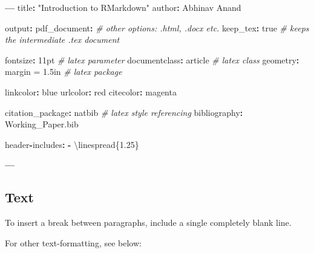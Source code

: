 \documentclass[11pt,]{article}
\newenvironment{Shaded}{\begin{snugshade}}{\end{snugshade}}
\newcommand{\FloatTok}[1]{\textcolor[rgb]{0.00,0.00,0.81}{#1}}
\newcommand{\StringTok}[1]{\textcolor[rgb]{0.31,0.60,0.02}{#1}}
\newcommand{\CommentTok}[1]{\textcolor[rgb]{0.56,0.35,0.01}{\textit{#1}}}
\newcommand{\OperatorTok}[1]{\textcolor[rgb]{0.81,0.36,0.00}{\textbf{#1}}}
\newcommand{\NormalTok}[1]{#1}
\begin{document}
\begin{Shaded}
\begin{Highlighting}[]
\OperatorTok{---}
\NormalTok{title}\OperatorTok{:}\StringTok{ "Introduction to RMarkdown"}
\NormalTok{author}\OperatorTok{:}\StringTok{ }\NormalTok{Abhinav Anand}

\NormalTok{output}\OperatorTok{:}
\StringTok{  }\NormalTok{pdf_document}\OperatorTok{:}\StringTok{ }\CommentTok{# other options: .html, .docx etc.}
\StringTok{    }\NormalTok{keep_tex}\OperatorTok{:}\StringTok{ }\NormalTok{true }\CommentTok{# keeps the intermediate .tex document}

\NormalTok{fontsize}\OperatorTok{:}\StringTok{ }\NormalTok{11pt }\CommentTok{# latex parameter}
\NormalTok{documentclass}\OperatorTok{:}\StringTok{ }\NormalTok{article }\CommentTok{# latex class}
\NormalTok{geometry}\OperatorTok{:}\StringTok{ }\NormalTok{margin =}\StringTok{ }\FloatTok{1.}\NormalTok{5in }\CommentTok{# latex package}

\NormalTok{linkcolor}\OperatorTok{:}\StringTok{ }\NormalTok{blue }
\NormalTok{urlcolor}\OperatorTok{:}\StringTok{ }\NormalTok{red}
\NormalTok{citecolor}\OperatorTok{:}\StringTok{ }\NormalTok{magenta}

\NormalTok{citation_package}\OperatorTok{:}\StringTok{ }\NormalTok{natbib }\CommentTok{# latex style referencing}
\NormalTok{bibliography}\OperatorTok{:}\StringTok{ }\NormalTok{Working_Paper.bib}

\NormalTok{header}\OperatorTok{-}\NormalTok{includes}\OperatorTok{:}
\StringTok{   }\OperatorTok{-}\StringTok{ }\NormalTok{\textbackslash{}linespread\{}\FloatTok{1.25}\NormalTok{\}}


\OperatorTok{---}
\end{Highlighting}
\end{Shaded}

\subsection{Text}\label{text}

To insert a break between paragraphs, include a single completely blank
line.

For other text-formatting, see below:
\end{document}

